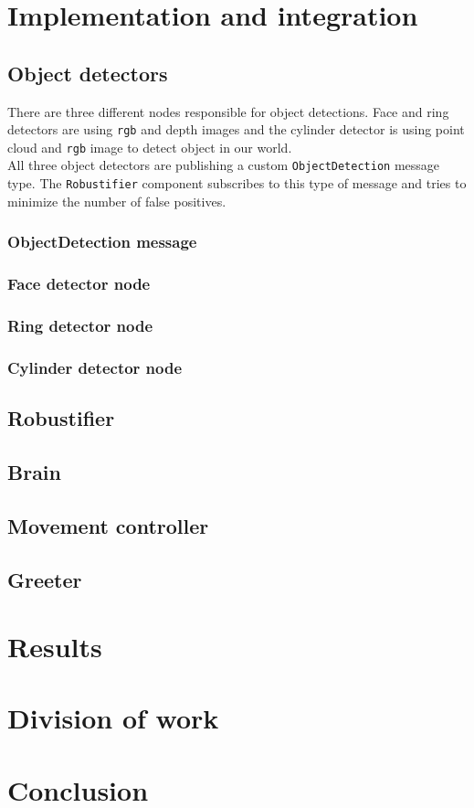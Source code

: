 \documentclass[12pt,a4paper]{article}
\begin{document}
	\section{Implementation and integration}

	
	\subsection{Object detectors}
	There are three different nodes responsible for object detections. Face and ring detectors are using \texttt{rgb} and depth images and the cylinder detector is using point cloud and \texttt{rgb} image to detect object in our world. \\
	
	All three object detectors are publishing a custom \texttt{ObjectDetection} message type. The \texttt{Robustifier} component subscribes to this type of message and tries to minimize the number of false positives. 
	
	\subsubsection{ObjectDetection message}
	
	\subsubsection{Face detector node}
	\subsubsection{Ring detector node}
	\subsubsection{Cylinder detector node}

	\subsection{Robustifier}
	
	\subsection{Brain}
	
	\subsection{Movement controller}
	
	\subsection{Greeter}
	
	\section{Results}
	\section{Division of work}
	
	\section{Conclusion}	
	
\end{document}
